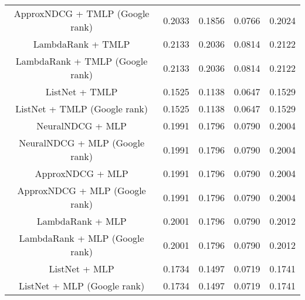 \begin{table}[ht]
\begin{tabular}{c|cccc}
			ApproxNDCG + TMLP (Google rank)            & 0.2033       & 0.1856       & 0.0766       & 0.2024          \\
			LambdaRank + TMLP                          & 0.2133       & 0.2036       & 0.0814       & 0.2122          \\
			LambdaRank + TMLP (Google rank)            & 0.2133       & 0.2036       & 0.0814       & 0.2122          \\
			ListNet + TMLP                             & 0.1525       & 0.1138       & 0.0647       & 0.1529          \\
			ListNet + TMLP (Google rank)               & 0.1525       & 0.1138       & 0.0647       & 0.1529          \\
			NeuralNDCG + MLP                           & 0.1991       & 0.1796       & 0.0790       & 0.2004          \\
			NeuralNDCG + MLP (Google rank)             & 0.1991       & 0.1796       & 0.0790       & 0.2004          \\
			ApproxNDCG + MLP                           & 0.1991       & 0.1796       & 0.0790       & 0.2004          \\
			ApproxNDCG + MLP (Google rank)             & 0.1991       & 0.1796       & 0.0790       & 0.2004          \\
			LambdaRank + MLP                           & 0.2001       & 0.1796       & 0.0790       & 0.2012          \\
			LambdaRank + MLP (Google rank)             & 0.2001       & 0.1796       & 0.0790       & 0.2012          \\
			ListNet + MLP                              & 0.1734       & 0.1497       & 0.0719       & 0.1741          \\
			ListNet + MLP   (Google rank)              & 0.1734       & 0.1497       & 0.0719       & 0.1741          \\
	\end{tabular}
\end{table}